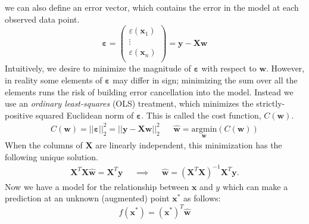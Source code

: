\documentclass[11pt]{article}
\begin{document}
we can also define an error vector, which contains the error in the model at
each observed data point.
\begin{equation} 
	\boldsymbol{\varepsilon} 
= 
	\begin{pmatrix}
	\varepsilon(\mathbf{x}_1) \\ \vdots \\ \varepsilon(\mathbf{x}_n) \\
	\end{pmatrix} = \mathbf{y} - \mathbf{X} \mathbf{w} 
\end{equation} 
Intuitively, we desire to minimize the magnitude of $\boldsymbol{\varepsilon}$
with respect to $\mathbf{w}$.
However, in reality some elements of $\boldsymbol{\varepsilon}$ may differ in
sign; minimizing the sum over all the elements runs the risk of building error
cancellation into the model.  
Instead we use an {\it ordinary least-squares} (OLS) treatment, which minimizes
the strictly-positive squared Euclidean norm of $\boldsymbol{\varepsilon}$.
This is called the cost function, $C(\mathbf{w})$.  
\begin{align} 
	C(\mathbf{w})
= 
	||
		\boldsymbol{\varepsilon} 
	||_2^2 
= 
	|| 
		\mathbf{y} 
	- 
		\mathbf{X} 
		\mathbf{w} 
	||_2^2
&& 
	\hat{\mathbf{w}} 
= 
	\underset{
		\mathbf{w}
			}
			{
				\mathrm{argmin}
			}
	(C(\mathbf{w}))
\end{align} 
When the columns of $\mathbf{X}$ are linearly independent, this
minimization has the following unique solution. 
\begin{align}
\label{eq:ols-solution} 
	\mathbf{X}^T 
	\mathbf{X} 
	\hat{\mathbf{w}} 
= 
\mathbf{X}^T
\mathbf{y} 
&& 
	\implies 
&& 
	\hat{\mathbf{w}}
=
	\left( 
		\mathbf{X}^T 
		\mathbf{X}
	\right)^{-1} 
	\mathbf{X}^T 
	\mathbf{y}.  
\end{align} 
Now we have a model for the relationship between $\mathbf{x}$ and $y$ which can
make a prediction at an unknown (augmented) point $\mathbf{x}^*$ as follows:
\begin{equation} 
	f(\mathbf{x}^*) 
=
	(\mathbf{x}^*)^T 
	\mathbf{\hat{w}} 
\end{equation} 
\newpage
\end{document}
